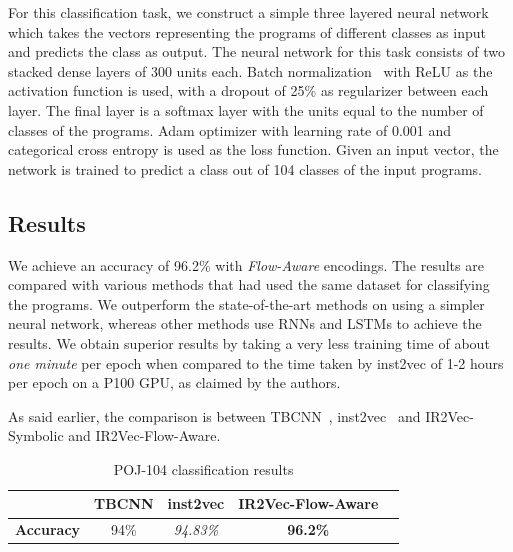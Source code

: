 For this classification task, we construct a simple three layered neural network which takes the vectors representing the programs of different classes as input and predicts the class as output. The neural network for this task consists of two stacked dense layers of 300 units each. Batch normalization~\cite{pmlr-v37-ioffe15-batchnorm} with ReLU as the activation function is used, with a dropout of 25\% as regularizer between each layer. The final layer is a softmax layer with the units equal to the number of classes of the programs. Adam optimizer with learning rate of 0.001 and categorical cross entropy is used as the loss function. Given an input vector, the network is trained to predict a class out of 104 classes of the input programs. 

\subsection{Results}

We achieve an accuracy of 96.2\% with \textit{Flow-Aware} encodings. 
The results are compared with various methods that had used the same dataset for classifying the programs. We outperform the state-of-the-art methods on using a simpler neural network, whereas other methods use RNNs and LSTMs to achieve the results.
We obtain superior results by taking a very less training time of about \textit{one minute} per epoch when compared to the time taken by inst2vec of 1-2 hours per epoch on a P100 GPU, as claimed by the authors. 

As said earlier, the comparison is between TBCNN~\cite{tbcnn-aaai16}, inst2vec~\cite{ncc} and IR2Vec-Symbolic and IR2Vec-Flow-Aware.

\begin{table}[h]
\centering
  \caption{POJ-104 classification results}
  \label{tab:pc_accuracy}   %
    \begin{tabular}{ccccc}
    \toprule
     & \textbf{TBCNN} & \textbf{inst2vec} & \textbf{IR2Vec-Flow-Aware}\\
        \hline
        \textbf{Accuracy} & 94\% & \textit{94.83\%\protect\footnotemark}  & \textbf{96.2\%} \\
    \bottomrule
    \end{tabular}
\end{table}


